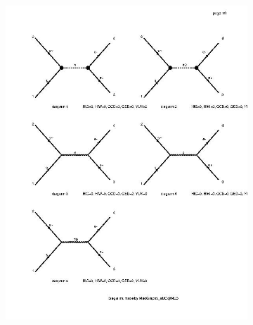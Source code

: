 \documentclass{CUP-JNL-DTM}%
\theoremstyle{definition}
\numberwithin{equation}{section}
\begin{document}
\begin{figure}[H]
  \begin{subfigure}{.5\textwidth}
    \centering
    \includegraphics[width=1\linewidth]{img/dy_bsm_diag.jpg}
    \label{fig:bsm_dy1}
  \end{subfigure}%
  \begin{subfigure}{.5\textwidth}
    \centering

\end{subfigure}
\end{figure}
\end{document}
